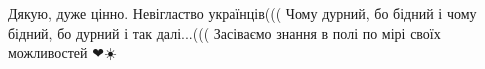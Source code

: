 \begin{itemize}
 

Дякую, дуже цінно. Невігластво українців((( Чому дурний, бо бідний і чому
бідний, бо дурний і так далі...((( Засіваємо знання в полі по мірі своїх
можливостей ❤☀️

\end{itemize}

